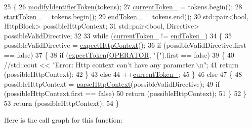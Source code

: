 \begin{DoxyCode}
25     \{
26         \hyperlink{classft_1_1_parser_a8226e5286bd1e9354998fe9e6bb63d08}{modifyIdentifierToken}(tokens);
27         \hyperlink{classft_1_1_parser_a942c5b794d108f144c5b5028aaa34cb6}{currentToken\_} = tokens.begin();
28         \hyperlink{classft_1_1_parser_a85bbb595991c68a1ec2751fabcb8eae5}{startToken\_} = tokens.begin();
29         \hyperlink{classft_1_1_parser_a538ba3ab8ee1d0cef5cc3c999f3ab44c}{endToken\_} = tokens.end();
30         std::pair<bool, HttpBlock> possibleHttpContext;
31         std::pair<bool, Directive> possibleValidDirective;
32 
33         \textcolor{keywordflow}{while} (\hyperlink{classft_1_1_parser_a942c5b794d108f144c5b5028aaa34cb6}{currentToken\_} != \hyperlink{classft_1_1_parser_a538ba3ab8ee1d0cef5cc3c999f3ab44c}{endToken\_})
34         \{
35             possibleValidDirective = \hyperlink{classft_1_1_parser_abcf864a160e3c4e1866edceae06b921b}{expectHttpContext}();
36             \textcolor{keywordflow}{if} (possibleValidDirective.first == \textcolor{keyword}{false})
37             \{
38                 \textcolor{keywordflow}{if} (\hyperlink{classft_1_1_parser_a1615a752d3642bb53598e2c8db810db0}{expectToken}(\hyperlink{namespaceft_aa520fbf142ba1e7e659590c07da31921a6411d9d6073252e4d316493506bbb979}{OPERATOR}, \textcolor{stringliteral}{"\{"}).first == \textcolor{keyword}{false})
39                 \{
40                     \textcolor{comment}{//std::cout << "Error: Http context can't have any parameter.\(\backslash\)n";}
41                     \textcolor{keywordflow}{return} (possibleHttpContext);
42                 \}
43                 \textcolor{keywordflow}{else}
44                     ++\hyperlink{classft_1_1_parser_a942c5b794d108f144c5b5028aaa34cb6}{currentToken\_};
45             \}
46             \textcolor{keywordflow}{else}
47             \{
48                 possibleHttpContext = \hyperlink{classft_1_1_parser_a17a213759b2cca8e91ca225b2e86739d}{parseHttpContext}(possibleValidDirective);
49                 \textcolor{keywordflow}{if} (possibleHttpContext.first == \textcolor{keyword}{false})
50                     \textcolor{keywordflow}{return} (possibleHttpContext);
51             \}
52         \}
53         \textcolor{keywordflow}{return} (possibleHttpContext);
54     \}
\end{DoxyCode}
Here is the call graph for this function\+:
\nopagebreak
